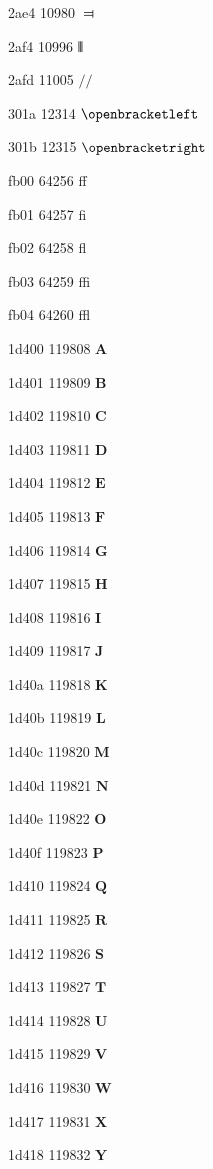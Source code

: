 \documentclass[11pt]{article}
\begin{document}
2ae4 10980 \ensuremath{\Dashv}

2af4 10996 \ensuremath{\interleave}

2afd 11005 \ensuremath{{{/}\!\!{/}}}

301a 12314 \ensuremath{\openbracketleft}

301b 12315 \ensuremath{\openbracketright}

fb00 64256 ff

fb01 64257 fi

fb02 64258 fl

fb03 64259 ffi

fb04 64260 ffl

1d400 119808 \ensuremath{\mathbf{A}}

1d401 119809 \ensuremath{\mathbf{B}}

1d402 119810 \ensuremath{\mathbf{C}}

1d403 119811 \ensuremath{\mathbf{D}}

1d404 119812 \ensuremath{\mathbf{E}}

1d405 119813 \ensuremath{\mathbf{F}}

1d406 119814 \ensuremath{\mathbf{G}}

1d407 119815 \ensuremath{\mathbf{H}}

1d408 119816 \ensuremath{\mathbf{I}}

1d409 119817 \ensuremath{\mathbf{J}}

1d40a 119818 \ensuremath{\mathbf{K}}

1d40b 119819 \ensuremath{\mathbf{L}}

1d40c 119820 \ensuremath{\mathbf{M}}

1d40d 119821 \ensuremath{\mathbf{N}}

1d40e 119822 \ensuremath{\mathbf{O}}

1d40f 119823 \ensuremath{\mathbf{P}}

1d410 119824 \ensuremath{\mathbf{Q}}

1d411 119825 \ensuremath{\mathbf{R}}

1d412 119826 \ensuremath{\mathbf{S}}

1d413 119827 \ensuremath{\mathbf{T}}

1d414 119828 \ensuremath{\mathbf{U}}

1d415 119829 \ensuremath{\mathbf{V}}

1d416 119830 \ensuremath{\mathbf{W}}

1d417 119831 \ensuremath{\mathbf{X}}

1d418 119832 \ensuremath{\mathbf{Y}}
\end{document}
